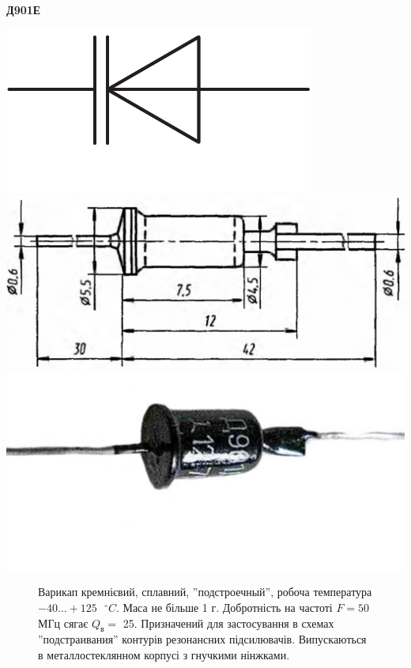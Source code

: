\documentclass[a4paper,14pt]{extreport}
\begin{document}
\clearpage
\begin{tcolorbox}[colback=white!100,colframe=red!75!black,width=19cm,righttitle=0.5cm,subtitle style={boxrule=0.4pt, colback=yellow!50!red!25!white},title= \bf{Графічне позначення}\hfill  \bf{Натуральне зоображення}]
  \begin{center}\bf{Д901Е}\end{center}
  \tcblower
  \includegraphics[scale=0.55]{1.4.1.pdf}\hfill \includegraphics[scale=0.17]{1.4.6.png} \hfill\includegraphics[scale=0.3]{1.4.7.pdf}
\end{tcolorbox}
\begin{figure}
\vspace{-0.7 cm}
\parbox{14cm}{%
  \begin{tcolorbox}[width=13.5cm,right=0.5cm]
  Варикап кремнієвий, сплавний, ''подстроечный'', робоча температура $-40\ldots+125 \text{ }^{ \circ}C$.
  Маса не більше 1 г. Добротність на частоті $F = 50$ МГц сягає $Q_{\text{в}}=$ 25.
Призначений для застосування в схемах ''подстраивания'' контурів резонансних підсилювачів.
Випускаються в металлостеклянном корпусі з гнучкими нінжками.

  \end{tcolorbox}}
\end{figure}
\end{document}

